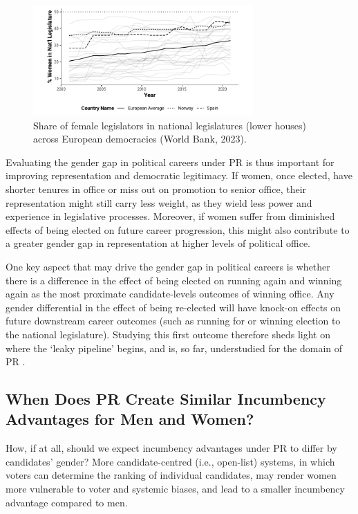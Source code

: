 \documentclass[12pt]{article}
\begin{document}
\begin{figure}[!htb]
    \centering
    \includegraphics[width = 0.75\textwidth]{../output/figures/csts_plot.pdf}
    \caption{Share of female legislators in national legislatures (lower houses) across European democracies (World Bank, 2023).}
    \label{fig:csts_plot}
\end{figure}

Evaluating the gender gap in political careers under PR is thus important for improving representation and democratic legitimacy. If women, once elected, have shorter tenures in office or miss out on promotion to senior office, their representation might still carry less weight, as they wield less power and experience in legislative processes. Moreover, if women suffer from diminished effects of being elected on future career progression, this might also contribute to a greater gender gap in representation at higher levels of political office.

One key aspect that may drive the gender gap in political careers is whether there is a difference in the effect of being elected on running again and winning again as the most proximate candidate-levels outcomes of winning office. Any gender differential in the effect of being re-elected will have knock-on effects on future downstream career outcomes (such as running for or winning election to the national legislature). Studying this first outcome therefore sheds light on where the `leaky pipeline' begins, and is, so far, understudied for the domain of PR \citep{smrek2020}.

\subsection{When Does PR Create Similar Incumbency Advantages for Men and Women?}

How, if at all, should we expect incumbency advantages under PR to differ by candidates' gender? More candidate-centred (i.e., open-list) systems, in which voters can determine the ranking of individual candidates, may render women more vulnerable to voter and systemic biases, and lead to a smaller incumbency advantage compared to men.
\end{document}
